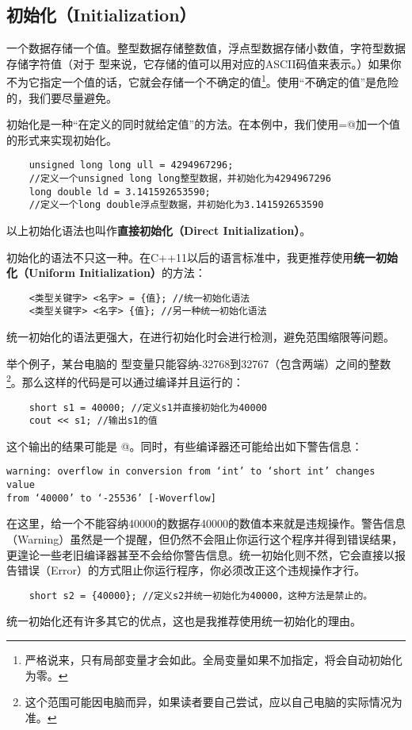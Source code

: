 \subsection*{初始化（Initialization）}
一个数据存储一个值。整型数据存储整数值，浮点型数据存储小数值，字符型数据存储字符值（对于 \lstinline@char@ 型来说，它存储的值可以用对应的ASCII码值来表示。）如果你不为它指定一个值的话，它就会存储一个不确定的值\footnote{严格说来，只有局部变量才会如此。全局变量如果不加指定，将会自动初始化为零。}。使用``不确定的值''是危险的，我们要尽量避免。\par
初始化是一种``在定义的同时就给定值''的方法。在本例中，我们使用\lstinline@=@加一个值的形式来实现初始化。
\begin{lstlisting}
    unsigned long long ull = 4294967296;
    //定义一个unsigned long long整型数据，并初始化为4294967296
    long double ld = 3.141592653590;
    //定义一个long double浮点型数据，并初始化为3.141592653590
\end{lstlisting}
以上初始化语法也叫作\textbf{直接初始化（Direct Initialization）}。\par
初始化的语法不只这一种。在C++11以后的语言标准中，我更推荐使用\textbf{统一初始化（Uniform Initialization）}的方法：
\begin{lstlisting}
    <类型关键字> <名字> = {值}; //统一初始化语法
    <类型关键字> <名字> {值}; //另一种统一初始化语法
\end{lstlisting}
统一初始化的语法更强大，在进行初始化时会进行检测，避免范围缩限等问题。\par
举个例子，某台电脑的 \lstinline@short@ 型变量只能容纳-32768到32767（包含两端）之间的整数\footnote{这个范围可能因电脑而异，如果读者要自己尝试，应以自己电脑的实际情况为准。}。那么这样的代码是可以通过编译并且运行的：
\begin{lstlisting}
    short s1 = 40000; //定义s1并直接初始化为40000
    cout << s1; //输出s1的值
\end{lstlisting}
这个输出的结果可能是 @。同时，有些编译器还可能给出如下警告信息：
\begin{lstlisting}
warning: overflow in conversion from ‘int’ to ‘short int’ changes value
from ‘40000’ to ‘-25536’ [-Woverflow]
\end{lstlisting}\par
在这里，给一个不能容纳40000的数据存40000的数值本来就是违规操作。警告信息（Warning）虽然是一个提醒，但仍然不会阻止你运行这个程序并得到错误结果，更遑论一些老旧编译器甚至不会给你警告信息。统一初始化则不然，它会直接以报告错误（Error）的方式阻止你运行程序，你必须改正这个违规操作才行。
\begin{lstlisting}
    short s2 = {40000}; //定义s2并统一初始化为40000，这种方法是禁止的。
\end{lstlisting}\par
统一初始化还有许多其它的优点，这也是我推荐使用统一初始化的理由。\par

